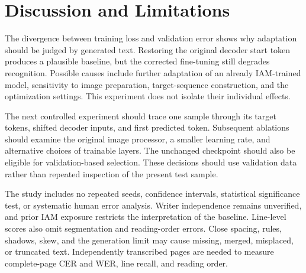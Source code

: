 \documentclass[conference]{IEEEtran}
\begin{document}
\section{Discussion and Limitations}
The divergence between training loss and validation error shows why adaptation should be judged by generated text. Restoring the original decoder start token produces a plausible baseline, but the corrected fine-tuning still degrades recognition. Possible causes include further adaptation of an already IAM-trained model, sensitivity to image preparation, target-sequence construction, and the optimization settings. This experiment does not isolate their individual effects.

The next controlled experiment should trace one sample through its target tokens, shifted decoder inputs, and first predicted token. Subsequent ablations should examine the original image processor, a smaller learning rate, and alternative choices of trainable layers. The unchanged checkpoint should also be eligible for validation-based selection. These decisions should use validation data rather than repeated inspection of the present test sample.

The study includes no repeated seeds, confidence intervals, statistical significance test, or systematic human error analysis. Writer independence remains unverified, and prior IAM exposure restricts the interpretation of the baseline. Line-level scores also omit segmentation and reading-order errors. Close spacing, rules, shadows, skew, and the generation limit may cause missing, merged, misplaced, or truncated text. Independently transcribed pages are needed to measure complete-page CER and WER, line recall, and reading order.
\end{document}
